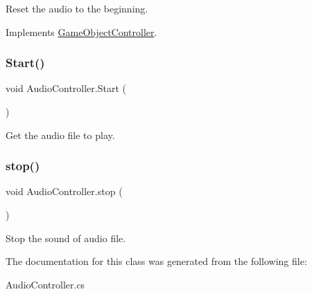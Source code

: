 Reset the audio to the beginning. 



Implements \hyperlink{class_game_object_controller_a5e57dfd66120a1400e5947f5664a41e4}{Game\+Object\+Controller}.

\hypertarget{class_audio_controller_a9f54b63fdcc425116ff24c93775a1338}{}\label{class_audio_controller_a9f54b63fdcc425116ff24c93775a1338} 
\subsubsection{\texorpdfstring{Start()}{Start()}}
{\footnotesize\ttfamily void Audio\+Controller.\+Start (\begin{DoxyParamCaption}{ }\end{DoxyParamCaption})\hspace{0.3cm}{\ttfamily [private]}}



Get the audio file to play. 

\hypertarget{class_audio_controller_aeac4b18138013f602f8f1d67cb5daa2e}{}\label{class_audio_controller_aeac4b18138013f602f8f1d67cb5daa2e} 
\subsubsection{\texorpdfstring{stop()}{stop()}}
{\footnotesize\ttfamily void Audio\+Controller.\+stop (\begin{DoxyParamCaption}{ }\end{DoxyParamCaption})}



Stop the sound of audio file. 



The documentation for this class was generated from the following file\+:\begin{DoxyCompactItemize}
\item 
Audio\+Controller.\+cs\end{DoxyCompactItemize}
